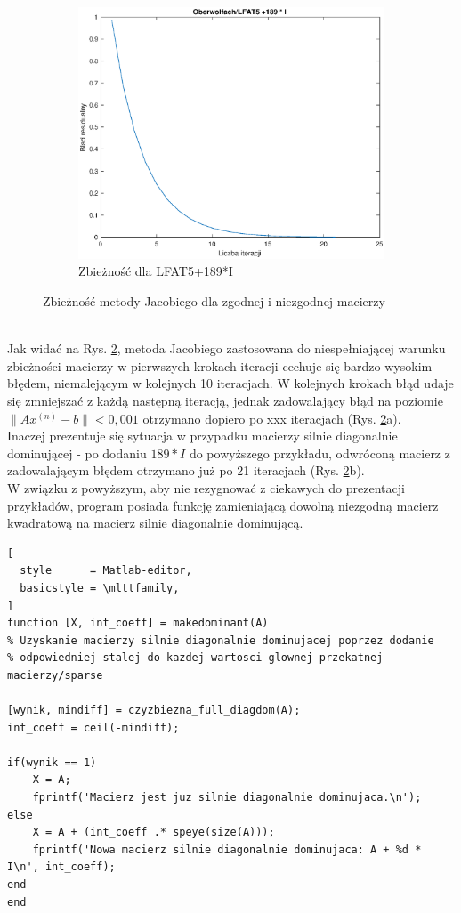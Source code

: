 \documentclass[a4paper,margin=1.54cm]{article}
\begin{document}
\begin{figure}[!ht]
\begin{subfigure}[!ht]{0.45\textwidth}
        \includegraphics[width=\textwidth]{5zbiega.eps}
        \caption{Zbieżność dla LFAT5+189*I}
        \label{fig:5niezbiega}
    \end{subfigure}
    \caption{Zbieżność metody Jacobiego dla zgodnej i niezgodnej macierzy}\label{fig:LFAT5}
\end{figure}
\\Jak widać na Rys. \ref{fig:LFAT5}, metoda Jacobiego zastosowana do niespełniającej warunku zbieżności macierzy w pierwszych krokach iteracji cechuje się bardzo wysokim błędem, niemalejącym w kolejnych 10 iteracjach. W kolejnych krokach błąd udaje się zmniejszać z każdą następną iteracją, jednak zadowalający błąd na poziomie $\|Ax^{(n)} - b\| < 0,001$ otrzymano dopiero po xxx iteracjach (Rys. \ref{fig:LFAT5}a).\\
Inaczej prezentuje się sytuacja w przypadku macierzy silnie diagonalnie dominującej - po dodaniu $189*I$ do powyższego przykładu, odwróconą macierz z zadowalającym błędem otrzymano już po 21 iteracjach (Rys. \ref{fig:LFAT5}b).\\
W związku z powyższym, aby nie rezygnować z ciekawych do prezentacji przykładów, program posiada funkcję zamieniającą dowolną niezgodną macierz kwadratową na macierz silnie diagonalnie dominującą. 

\begin{lstlisting}[
  style      = Matlab-editor,
  basicstyle = \mlttfamily,
]
function [X, int_coeff] = makedominant(A)
% Uzyskanie macierzy silnie diagonalnie dominujacej poprzez dodanie
% odpowiedniej stalej do kazdej wartosci glownej przekatnej macierzy/sparse

[wynik, mindiff] = czyzbiezna_full_diagdom(A);
int_coeff = ceil(-mindiff);

if(wynik == 1)
    X = A;
    fprintf('Macierz jest juz silnie diagonalnie dominujaca.\n');
else
    X = A + (int_coeff .* speye(size(A)));
    fprintf('Nowa macierz silnie diagonalnie dominujaca: A + %d * I\n', int_coeff);
end
end

\end{lstlisting}
\end{document}
